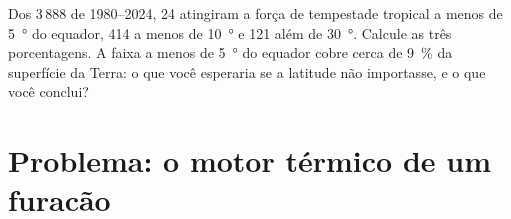 \begin{exercise}[$\star\star\star$]\label{exo:g10:storms-and-cyclones:15}
Dos 3\,888  de 1980--2024, 24 atingiram a força de
tempestade tropical a menos de \qty{5}{\degree} do equador, 414 a menos de
\qty{10}{\degree} e 121 além de \qty{30}{\degree}. Calcule as três
porcentagens. A faixa a menos de \qty{5}{\degree} do equador cobre cerca de
\qty{9}{\percent} da superfície da Terra: o que você esperaria se a latitude
não importasse, e o que você conclui?
\end{exercise}

\section{Problema: o motor térmico de um furacão}

